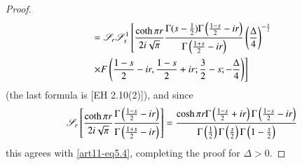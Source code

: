 \begin{proof}
\begin{align*}
& = \mathscr{S}_r \mathscr{S}^1_s \left[\frac{\coth \pi r}{ 2 i \sqrt{\pi}} \frac{\Gamma (s - \frac{1}{2}) \Gamma \left(\frac{1-s}{2} -ir \right) }{\Gamma \left(\frac{1+s}{2} - ir \right)} \left(\frac{\Delta}{4} \right)^{-\frac{s}{2}} \right. \\ 
& \left. \times F \left(\frac{1-s}{2} - ir, \frac{1-s}{2} + ir; \frac{3}{2} - s ; -\frac{\Delta}{4} \right)\right]
\end{align*}\pageoriginale
(the last formula is [EH 2.10(2)]), and since 
$$
\mathscr{S}_r \left[\frac{\coth \pi r}{2 i \sqrt{\pi}} \frac{\Gamma \left(\frac{1-s}{2} -ir \right)}{\Gamma \left(\frac{1+s}{2} -ir\right)} \right] = \frac{\cosh \pi r \Gamma \left(\frac{1-s}{2} + ir \right) \Gamma \left(\frac{1-s}{2} -ir \right)}{ \Gamma \left(\frac{1}{2} \right) \Gamma \left(\frac{s}{2} \right) \Gamma \left(1-\frac{s}{2} \right)}
$$
this agrees with \eqref{art11-eq5.4}, completing the proof for $\Delta > 0$.


\end{proof}
